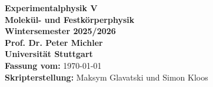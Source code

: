 \newcommand{\LectureTitle}{Experimentalphysik V}
\newcommand{\LectureSubtitle}{Molekül- und Festkörperphysik}
\newcommand{\LectureSemester}{WS 2025/26}
\newcommand{\LecturerTitle}{Prof. Dr.}
\newcommand{\LecturerName}{Peter Michler}

\newcommand{\LatestUpdate}{\today}

\newcommand{\AuthorOne}{Maksym Glavatski}
\newcommand{\AuthorTwo}{Simon Kloos}
\newcommand{\ContactEmail}{\href{mailto:st189361@stud.uni-stuttgart.de}{st189361@stud.uni-stuttgart.de}}


\newcommand{\ttpgfont}{\fontfamily{phv}\selectfont}
\renewcommand{\ttpgfont}{}

\begin{titlepage}
    \centering
    \Huge\textbf{Experimentalphysik V}\\
    \huge\textbf{Molekül- und Festkörperphysik}\\[1em]
    \large\textbf{Wintersemester 2025/2026}\\[1em]
    \huge\textbf{Prof. Dr. Peter Michler}\\[1em]
    \large\textbf{Universität Stuttgart}\\
    \vfill
    \Large\textbf{Fassung vom:} \LatestUpdate\\[1em]
    \Large\textbf{Skripterstellung:} Maksym Glavatski und Simon Kloos


\end{titlepage}